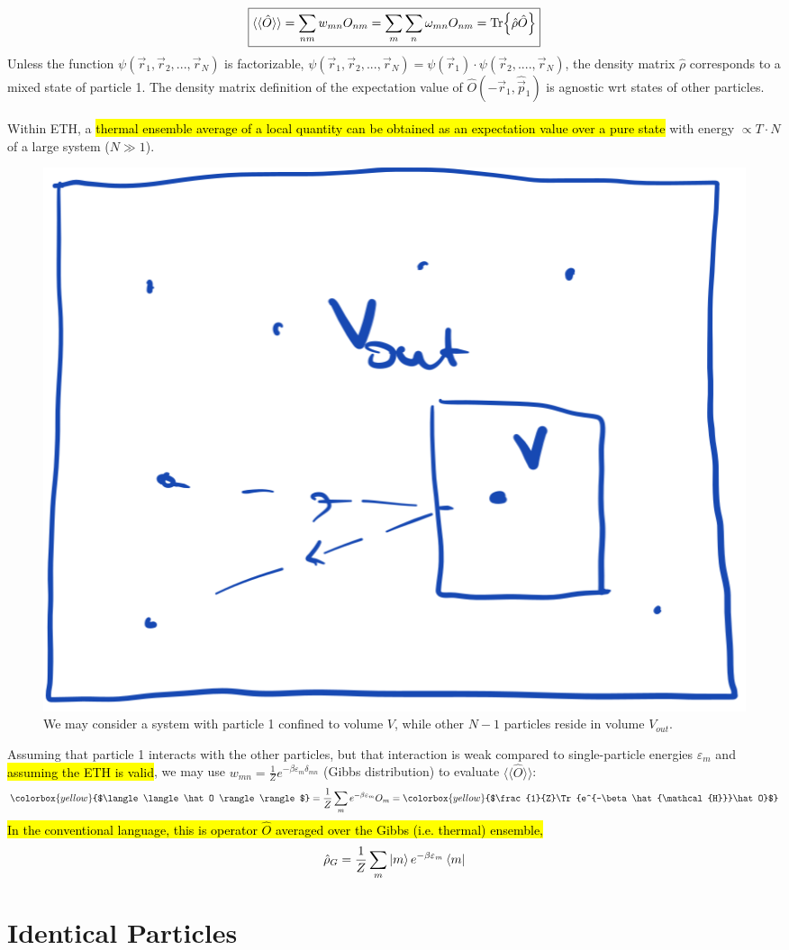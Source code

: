 \documentclass[10pt]{article}
\newcommand{\Ham}{\hat{\mathcal{H}}}
\newcommand{\vecop}[1]{\hat{\vec{#1}}}
\begin{document}
$$
\boxed{\langle \langle \hat O \rangle \rangle = \sum_{nm} w_{mn} O_{nm} = \sum_{m}\sum_n \omega_{mn}O_{nm} = \Tr{\hat \rho \hat O}}
$$
Unless the function $\psi(\vec r_1, \vec r_2, ..., \vec r_N)$ is factorizable, $\psi(\vec r_1, \vec r_2, ..., \vec r_N) = \psi(\vec r_1)\cdot \psi(\vec r_2, ...., \vec r_N)$, the density matrix $\hat \rho$ corresponds to a mixed state of particle 1. The density matrix definition of the expectation value of $\hat O(-\vec r_1, \vecop p_1)$ is agnostic wrt states of other particles.\\ \\
\noindent Within ETH, a \hl{thermal ensemble average of a local quantity can be obtained as an expectation value over a pure state} with energy $\propto T \cdot N$ of a large system ($N \gg 1$).
\begin{figure}[hbt!]
    \centering
    \includegraphics[width = .25\textwidth]{./figures/ss.png}
    \caption{We may consider a system with particle 1 confined to volume $V$, while other $N-1$ particles reside in volume $V_{out}$.}
\end{figure}
Assuming that particle 1 interacts with the other particles, but that interaction is weak compared to single-particle energies $\varepsilon_m$ and \hl{assuming the ETH is valid}, we may use $w_{mn} = \frac{1}{Z} e^{-\beta \varepsilon_m\delta_{mn}}$ (Gibbs distribution) to evaluate $\langle \langle \hat O \rangle \rangle$:
$$
\colorbox{yellow}{$\langle \langle \hat O \rangle \rangle$} = \frac{1}{Z}\sum_{m}e^{-\beta \varepsilon_m}O_m = \colorbox{yellow}{$\frac{1}{Z}\Tr{e^{-\beta \Ham}\hat O}$}
$$
\hl{In the conventional language, this is operator $\hat O$ averaged over the Gibbs (i.e. thermal) ensemble,}
$$
\hat \rho_G = \frac{1}{Z}\sum_m \ket{m}e^{-\beta \varepsilon_m}\bra{m}
$$
\section{Identical Particles}
\end{document}
